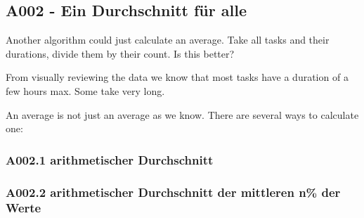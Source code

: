 \newpage{}
\newpage{}

\subsection{A002 - Ein Durchschnitt für alle}

Another algorithm could just calculate an average. Take all tasks and
their durations, divide them by their count. Is this better?

From visually reviewing the data we know that most tasks have a duration
of a few hours max. Some take very long.

An average is not just an average as we know. There are several ways to
calculate one:

\subsubsection{A002.1 arithmetischer Durchschnitt}
\subsubsection{A002.2 arithmetischer Durchschnitt der mittleren n\% der Werte}



